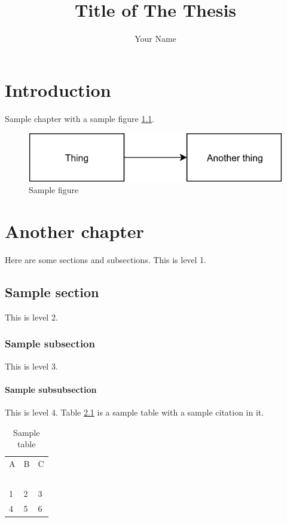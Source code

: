 \documentclass{qutad} %
\title{Title of The Thesis}
\author{Your Name}
\begin{document}
\makefrontmatter

\chapter{Introduction}
Sample chapter with a sample figure \ref{thefig}.
\lipsum

\begin{figure} [H]
  \centering
  \includegraphics[width=0.7\linewidth]{samplefig.png}
  \caption{Sample figure}
  \label{thefig}
\end{figure}

\chapter{Another chapter}
Here are some sections and subsections. This is level 1.
\lipsum

\section{Sample section}
This is level 2.
\lipsum

\subsection{Sample subsection}
This is level 3.
\lipsum

\subsubsection{Sample subsubsection}
This is level 4. Table \ref{sampletable} is a sample table with a sample citation in it.
\lipsum

\begin{table}[H]
  \begin{center}
    \caption{Sample table \cite{samplebib}}
    \label{sampletable}
    \begin{tabular}{m{1.5cm} m{1.5cm} m{5cm}}
      \hline
      A & B & C \\~\\
      \hline
      1 & 2 & 3 \\
      4 & 5 & 6 \\
      \hline
    \end{tabular}
  \end{center}
\end{table}
\end{document}
